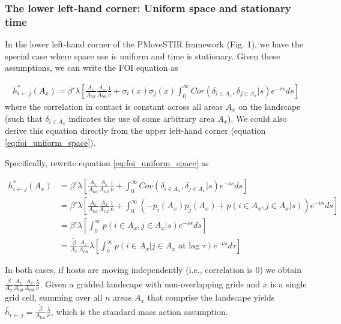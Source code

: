 \documentclass[letterpaper]{article}
\begin{document}
\subsubsection*{The lower left-hand corner: Uniform space and stationary time}

In the lower left-hand corner of the PMoveSTIR framework (Fig. 1), we have the special case where space use is uniform and time is stationary. Given these assumptions, we can write the FOI equation as

\begin{equation}
    \begin{aligned}
        h^*_{i \leftarrow j}(A_x) = \beta' \lambda \left[\frac{A_x}{A_{tot}}\frac{A_x}{A_{tot}} \frac{1}{\nu} + \sigma_i(x) \sigma_j(x) \int_{0}^{\infty} Cor(\delta_{i \in A_x}, \delta_{j \in A_x} | s) e^{-\nu s} ds\right]
    \end{aligned}
    \label{eq:uniform_stationary1}
\end{equation}
where the correlation in contact is constant across all areas $A_x$ on the landscape (such that $\delta_{i \in A_x}$ indicates the use of some arbitrary area $A_x$).  We could also derive this equation directly from the upper left-hand corner (equation \ref{eq:foi_uniform_space}).

Specifically, rewrite equation \ref{eq:foi_uniform_space} as 

\begin{equation}
    \begin{aligned}
        h^*_{i \leftarrow j}(A_x) &= \beta' \lambda [\frac{A_x}{A_{tot}}\frac{A_x}{A_{tot}} \frac{1}{\nu} + \int_{0}^{\infty} Cov(\delta_{i \in A_x}, \delta_{j \in A_x} | s) e^{-\nu s} ds] \\
        &= \beta' \lambda [\frac{A_x}{A_{tot}}\frac{A_x}{A_{tot}} \frac{1}{\nu} + \int_{0}^{\infty} ( - p_i(A_x)p_j(A_x) + p(i \in A_x, j \in A_x | s)) e^{-\nu s} ds] \\
        &= \beta' \lambda [\int_{0}^{\infty} p(i \in A_x, j \in A_x | s) e^{-\nu s} ds] \\
        &= \frac{\tilde{\beta}}{A_x} \frac{A_x}{A_{tot}} \lambda [\int_{0}^{\infty} p(i \in A_x | j \in A_x \text{ at lag } \tau) e^{-\nu s} d\tau]
    \end{aligned}
    \label{eq:uniform_stationary2}
\end{equation}

In both cases, if hosts are moving independently (i.e., correlation is 0) we obtain $\frac{\tilde{\beta}}{A_x} \frac{A_x}{A_{tot}} \frac{A_x}{A_{tot}}  \frac{\lambda}{\nu}$. Given a gridded landscape with non-overlapping grids and $x$ is a single grid cell, summing over all $n$ areas $A_x$ that comprise the landscape yields $\bar{h}_{i \leftarrow j} =\frac{\tilde{\beta}}{A_\text{tot}} \frac{\lambda}{\nu}$, which is the standard mass action assumption. 
\end{document}
